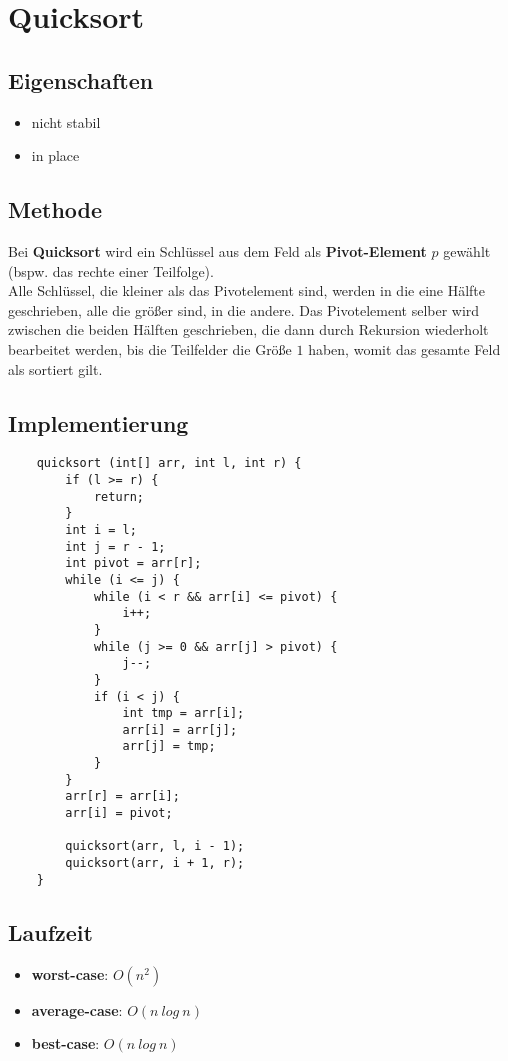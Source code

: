 \section{Quicksort}


\subsection{Eigenschaften}
\begin{itemize}
    \item nicht stabil
    \item in place
\end{itemize}

\subsection{Methode}
Bei \textbf{Quicksort}  wird ein Schlüssel aus dem Feld als \textbf{Pivot-Element} $p$ gewählt (bspw. das rechte einer Teilfolge).\\
Alle Schlüssel, die kleiner als das Pivotelement sind, werden in die eine Hälfte geschrieben, alle die größer sind, in die andere.
Das Pivotelement selber wird zwischen die beiden Hälften geschrieben, die dann durch Rekursion wiederholt bearbeitet werden, bis die Teilfelder die Größe $1$ haben, womit das gesamte Feld als sortiert gilt.


\subsection{Implementierung}
\begin{verbatim}
    quicksort (int[] arr, int l, int r) {
        if (l >= r) {
            return;
        }
        int i = l;
        int j = r - 1;
        int pivot = arr[r];
        while (i <= j) {
            while (i < r && arr[i] <= pivot) {
                i++;
            }
            while (j >= 0 && arr[j] > pivot) {
                j--;
            }
            if (i < j) {
                int tmp = arr[i];
                arr[i] = arr[j];
                arr[j] = tmp;
            }
        }
        arr[r] = arr[i];
        arr[i] = pivot;

        quicksort(arr, l, i - 1);
        quicksort(arr, i + 1, r);
    }
\end{verbatim}


\subsection{Laufzeit}
\begin{itemize}
    \item \textbf{worst-case}: $O(n^2)$
    \item \textbf{average-case}: $O(n\ log\ n)$
    \item \textbf{best-case}: $O(n\ log\ n)$
\end{itemize}

